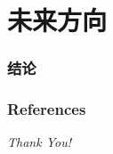 \documentclass[hyperref={pdfpagelabels=false}]{beamer}
\begin{document}
\section{未来方向}
\begin{frame}
	\tableofcontents[currentsection]
\end{frame} 
\begin{frame}
	\frametitle{结论}

\end{frame}

\begin{frame}[allowframebreaks]
	\frametitle{References}
	
	
\end{frame}

\begin{frame}{}
	\centering \Huge
	\emph{Thank You!}
\end{frame} 
\end{document}
